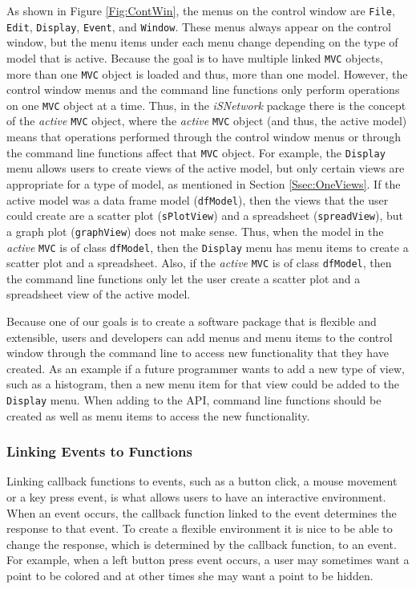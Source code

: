 \documentclass{article}[11pt]
\newcommand{\Robject}[1]{{\texttt{#1}}}
\newcommand{\Rpackage}[1]{{\textit{#1}}}
\newcommand{\Rclass}[1]{\texttt{#1}}
\begin{document}
As shown in Figure \ref{Fig:ContWin}, the menus on the control window are
\texttt{File}, \texttt{Edit}, \texttt{Display}, \texttt{Event}, and
\texttt{Window}.  These menus always appear on the control window, but the
menu items under each menu change depending on the type of model that is
active.  Because the goal is to have multiple linked \Robject{MVC} objects,
more than one \Robject{MVC} object is loaded and thus, more than one model.
However, the control window menus and the command line functions only perform
operations on one \Robject{MVC} object at a time.  Thus, in the
\Rpackage{iSNetwork} package there is the concept of the \textit{active}
\Robject{MVC} object, where the \textit{active} \Robject{MVC} object (and
thus, the active model) means that operations performed through the control
window menus or through the command line functions affect that \Robject{MVC}
object.  For example, the \texttt{Display} menu allows users to create views
of the active model, but only certain views are appropriate for a type of
model, as mentioned in Section \ref{Ssec:OneViews}.  If the active model was a
data frame model (\Rclass{dfModel}), then the views that the user could create
are a scatter plot (\Rclass{sPlotView}) and a spreadsheet
(\Rclass{spreadView}), but a graph plot (\Rclass{graphView}) does not make
sense.  Thus, when the model in the \textit{active} \Robject{MVC} is of class
\Rclass{dfModel}, then the \texttt{Display} menu has menu items to create a
scatter plot and a spreadsheet.  Also, if the \textit{active} \Robject{MVC} is
of class \Rclass{dfModel}, then the command line functions only let the user
create a scatter plot and a spreadsheet view of the active model.

Because one of our goals is to create a software package that is
flexible and extensible, users and developers can add menus and menu items 
to the control window through the command line to access new
functionality that they have created.  As an example if a future
programmer wants to add a new type of view, such as a histogram, then
a new menu item for that view could be added to the \texttt{Display}
menu.  When adding to the API, command line functions should be created as
well as menu items to access the new functionality.

\subsubsection{Linking Events to Functions}
\label{Ssec:OneEvent}

Linking callback functions to events, such as a button click, a mouse movement
or a key press event, is what allows users to have an interactive
environment.  When an event occurs, the callback function linked to the event
determines the response to that event.  To create a flexible environment
it is nice to be able to change the response, which is determined by the
callback function, to an event.  For example, when a left button press event
occurs, a user may sometimes want a point to be colored and at other times she
may want a point to be hidden.  
\end{document}
